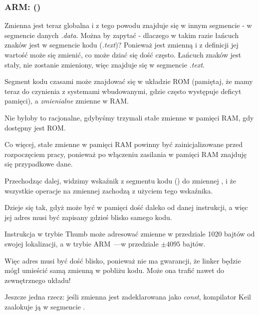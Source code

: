 \subsubsection{ARM: \OptimizingKeilVI (\ThumbMode)}



Zmienna  jest teraz globalna i z tego powodu znajduje się w innym segmencie - w segmencie danych \emph{.data}.
Można by zapytać - dlaczego w takim razie łańcuch znaków jest w segmencie kodu (\emph{.text})?
Ponieważ  jest zmienną i z definicji jej wartość może się zmienić, co może dziać się dość często.
Łańcuch znaków jest stały, nie zostanie zmieniony, więc znajduje się w segmencie \emph{.text}.
\myindex{\RAM}
\myindex{\ROM}

Segment kodu czasami może znajdować się w układzie \ac{ROM} (pamiętaj, że mamy teraz do czynienia
z systemami wbudowanymi, gdzie często występuje deficyt pamięci), a \emph{zmienialne} zmienne w \ac{RAM}.

Nie byłoby to racjonalne, gdybyśmy trzymali stałe zmienne w pamięci RAM, gdy dostępny jest ROM.

Co więcej, stałe zmienne w pamięci RAM powinny być zainicjalizowane przed rozpoczęciem pracy, ponieważ po włączeniu zasilania w pamięci RAM znajduję się przypadkowe dane.


Przechodząc dalej, widzimy wskaźnik z segmentu kodu () do zmiennej , i że wszystkie operacje na zmiennej zachodzą z użyciem tego wskaźnika.

Dzieje się tak, gdyż  może być w pamięci dość daleko od danej instrukcji, a więc jej adres musi być zapisany gdzieś blisko samego kodu.

Instrukcja  w trybie Thumb może adresować zmienne w przedziale 1020 bajtów od swojej lokalizacji,
a w trybie ARM~---w przedziale $\pm{}4095$ bajtów.

Więc adres 
musi być dość blisko, ponieważ nie ma gwarancji, że linker będzie mógł umieścić samą zmienną w pobliżu kodu. Może ona trafić nawet do zewnętrznego układu!

\myindex{\ROM}

Jeszcze jedna rzecz: jeśli zmienna jest zadeklarowana jako \emph{const}, kompilator Keil zaalokuje ją w segmencie .

